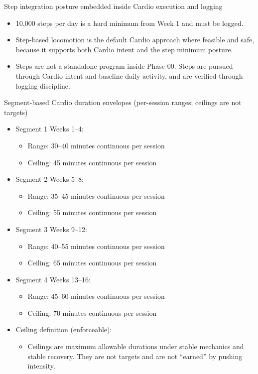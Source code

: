 \documentclass[10pt]{article}
\begin{document}
Step integration posture embedded inside Cardio execution and logging

\begin{itemize}
\item 10,000 steps per day is a hard minimum from Week 1 and must be logged.
\item Step-based locomotion is the default Cardio approach where feasible and safe, because it supports both Cardio intent and the step minimum posture.
\item Steps are not a standalone program inside Phase 00. Steps are pursued through Cardio intent and baseline daily activity, and are verified through logging discipline.
\end{itemize}

Segment-based Cardio duration envelopes (per-session ranges; ceilings are not targets)

\begin{itemize}
\item Segment 1 Weeks 1–4:
  \begin{itemize}
  \item Range: 30–40 minutes continuous per session
  \item Ceiling: 45 minutes continuous per session
  \end{itemize}
\item Segment 2 Weeks 5–8:
  \begin{itemize}
  \item Range: 35–45 minutes continuous per session
  \item Ceiling: 55 minutes continuous per session
  \end{itemize}
\item Segment 3 Weeks 9–12:
  \begin{itemize}
  \item Range: 40–55 minutes continuous per session
  \item Ceiling: 65 minutes continuous per session
  \end{itemize}
\item Segment 4 Weeks 13–16:
  \begin{itemize}
  \item Range: 45–60 minutes continuous per session
  \item Ceiling: 70 minutes continuous per session
  \end{itemize}
\item Ceiling definition (enforceable):
  \begin{itemize}
  \item Ceilings are maximum allowable durations under stable mechanics and stable recovery. They are not targets and are not “earned” by pushing intensity.
  \end{itemize}
\end{itemize}
\end{document}
